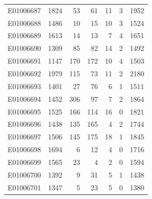 \documentclass[
  letterpaper,
  DIV=11,
  numbers=noendperiod]{scrreprt}
\begin{document}
\begin{tabular}{lrrrrrr}
E01006687     &    1824 &      53 &                    61 &                              11 &                       3 &              1952 \\
E01006688     &    1486 &      10 &                    15 &                              10 &                       3 &              1524 \\
E01006689     &    1613 &      14 &                    13 &                               7 &                       4 &              1651 \\
E01006690     &    1309 &      85 &                    82 &                              14 &                       2 &              1492 \\
E01006691     &    1147 &     170 &                   172 &                              10 &                       4 &              1503 \\
E01006692     &    1979 &     115 &                    73 &                              11 &                       2 &              2180 \\
E01006693     &    1401 &      27 &                    76 &                               6 &                       1 &              1511 \\
E01006694     &    1452 &     306 &                    97 &                               7 &                       2 &              1864 \\
E01006695     &    1525 &     166 &                   114 &                              16 &                       0 &              1821 \\
E01006696     &    1438 &     135 &                   165 &                               4 &                       2 &              1744 \\
E01006697     &    1506 &     145 &                   175 &                              18 &                       1 &              1845 \\
E01006698     &    1694 &       6 &                    12 &                               4 &                       0 &              1716 \\
E01006699     &    1565 &      23 &                     4 &                               2 &                       0 &              1594 \\
E01006700     &    1392 &       9 &                    31 &                               5 &                       1 &              1438 \\
E01006701     &    1347 &       5 &                    23 &                               5 &                       0 &              1380 \\

\end{tabular}
\end{document}
